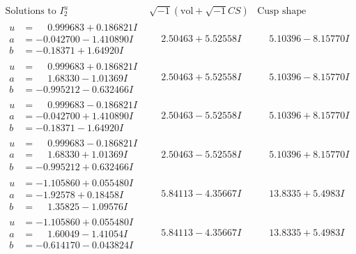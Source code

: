 \documentclass[1p]{elsarticle_modified}
\theoremstyle{definition}
\newcommand{\I}{\sqrt{-1}}
\begin{document}
$$\begin{array}{c|c|c}  
\text{Solutions to }I^u_{2}& \I (\text{vol} + \sqrt{-1}CS) & \text{Cusp shape}\\
 \hline 
\begin{aligned}
u &= \phantom{-}0.999683 + 0.186821 I \\
a &= -0.042700 - 1.410890 I \\
b &= -0.18371 + 1.64920 I\end{aligned}
 & \phantom{-}2.50463 + 5.52558 I & \phantom{-}5.10396 - 8.15770 I \\ \hline\begin{aligned}
u &= \phantom{-}0.999683 + 0.186821 I \\
a &= \phantom{-}1.68330 - 1.01369 I \\
b &= -0.995212 - 0.632466 I\end{aligned}
 & \phantom{-}2.50463 + 5.52558 I & \phantom{-}5.10396 - 8.15770 I \\ \hline\begin{aligned}
u &= \phantom{-}0.999683 - 0.186821 I \\
a &= -0.042700 + 1.410890 I \\
b &= -0.18371 - 1.64920 I\end{aligned}
 & \phantom{-}2.50463 - 5.52558 I & \phantom{-}5.10396 + 8.15770 I \\ \hline\begin{aligned}
u &= \phantom{-}0.999683 - 0.186821 I \\
a &= \phantom{-}1.68330 + 1.01369 I \\
b &= -0.995212 + 0.632466 I\end{aligned}
 & \phantom{-}2.50463 - 5.52558 I & \phantom{-}5.10396 + 8.15770 I \\ \hline\begin{aligned}
u &= -1.105860 + 0.055480 I \\
a &= -1.92578 + 0.18458 I \\
b &= \phantom{-}1.35825 - 1.09576 I\end{aligned}
 & \phantom{-}5.84113 - 4.35667 I & \phantom{-}13.8335 + 5.4983 I \\ \hline\begin{aligned}
u &= -1.105860 + 0.055480 I \\
a &= \phantom{-}1.60049 - 1.41054 I \\
b &= -0.614170 - 0.043824 I\end{aligned}
 & \phantom{-}5.84113 - 4.35667 I & \phantom{-}13.8335 + 5.4983 I \\ \hline\begin{aligned}

\end{aligned}
\end{array}$$
\end{document}
